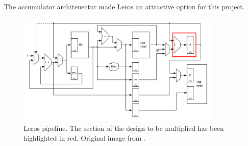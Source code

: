 The accumulator architeuectur made Leros an attractive option for this project.

\begin{figure}[h]
\center
\includegraphics[width=0.9\textwidth]{images/leros-system}
\caption{Leros pipeline. The section of the design to be multiplied has been
highlighted in red. Original image from \cite{schoeberlleros}.
}
\label{fig:leros-system}
\end{figure}
